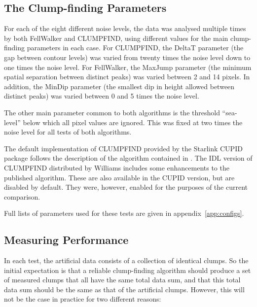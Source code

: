 \documentclass[final,authoryear,5p,times,twocolumn]{elsarticle}
\begin{document}
\subsection{The Clump-finding Parameters}
For each of the eight different noise levels, the data was analysed
multiple times by both FellWalker and CLUMPFIND, using different values
for the main clump-finding parameters in each case. For CLUMPFIND, the
DeltaT parameter (the gap between contour levels) was varied from twenty
times the noise level down to one times the noise level. For FellWalker,
the MaxJump parameter (the minimum spatial separation between distinct
peaks) was varied between 2 and 14 pixels. In addition, the MinDip
parameter (the smallest dip in height allowed between distinct peaks) was
varied between 0 and 5 times the noise level.

The other main parameter common to both algorithms is the threshold
``sea-level'' below which all pixel values are ignored. This was fixed at
two times the noise level for all tests of both algorithms.

The default implementation of CLUMPFIND provided by the Starlink CUPID
package follows the description of the algorithm contained in
\cite{1994Williams}. The IDL version of CLUMPFIND distributed by Williams
includes some enhancements to the published algorithm. These are also
available in the CUPID version, but are disabled by default. They were,
however, enabled for the purposes of the current comparison.

Full lists of parameters used for these tests are given in
appendix~\ref{app:configs}.

\subsection{Measuring Performance}
In each test, the artificial data consists of a collection of identical
clumps. So the initial expectation is that a reliable clump-finding
algorithm should produce a set of measured clumps that all have the same
total data sum, and that this total data sum should be the same as that
of the artificial clumps. However, this will not be the case in practice
for two different reasons:
\end{document}
